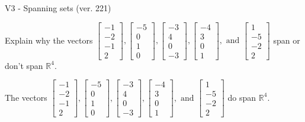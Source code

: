 \begin{exercise}
  \begin{exerciseTitle}V3 - Spanning sets (ver. 221)\end{exerciseTitle}
  \begin{exerciseStatement}
    Explain why the vectors \(\left[\begin{array}{r}
-1 \\
-2 \\
-1 \\
2
\end{array}\right] , \left[\begin{array}{r}
-5 \\
0 \\
1 \\
0
\end{array}\right] , \left[\begin{array}{r}
-3 \\
4 \\
0 \\
-3
\end{array}\right] , \left[\begin{array}{r}
-4 \\
3 \\
0 \\
1
\end{array}\right] , \text{ and } \left[\begin{array}{r}
1 \\
-5 \\
-2 \\
2
\end{array}\right]\) span or don't span \(\mathbb{R}^4\). 
	


  \end{exerciseStatement}
  \begin{exerciseAnswer}
   The vectors \(\left[\begin{array}{r}
-1 \\
-2 \\
-1 \\
2
\end{array}\right] , \left[\begin{array}{r}
-5 \\
0 \\
1 \\
0
\end{array}\right] , \left[\begin{array}{r}
-3 \\
4 \\
0 \\
-3
\end{array}\right] , \left[\begin{array}{r}
-4 \\
3 \\
0 \\
1
\end{array}\right] , \text{ and } \left[\begin{array}{r}
1 \\
-5 \\
-2 \\
2
\end{array}\right]\) 
  	 do  
	span \(\mathbb{R}^4\).
  



\end{exerciseAnswer}
\end{exercise}
